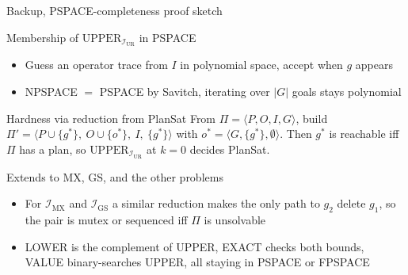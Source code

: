 \begin{frame}[noframenumbering]{Backup, PSPACE-completeness proof sketch}
    \hypertarget{bk:pspace-proof}{}
    \begin{block}{Membership of $\text{UPPER}_{\mathcal{I}_{\text{UR}}}$ in PSPACE}
        \footnotesize
        \begin{itemize}
            \item Guess an operator trace from $I$ in polynomial space, accept when $g$ appears
            \item NPSPACE $=$ PSPACE by Savitch, iterating over $|G|$ goals stays polynomial
        \end{itemize}
    \end{block}

    \begin{block}{Hardness via reduction from PlanSat}
        \footnotesize
        From $\Pi = \langle P, O, I, G \rangle$, build $\Pi' = \langle P \cup \{g^*\},\ O \cup \{o^*\},\ I,\ \{g^*\} \rangle$ with $o^* = \langle G, \{g^*\}, \emptyset \rangle$. Then $g^*$ is reachable iff $\Pi$ has a plan, so $\text{UPPER}_{\mathcal{I}_{\text{UR}}}$ at $k = 0$ decides PlanSat.
    \end{block}

    \begin{block}{Extends to MX, GS, and the other problems}
        \footnotesize
        \begin{itemize}
            \item For $\mathcal{I}_{\text{MX}}$ and $\mathcal{I}_{\text{GS}}$ a similar reduction makes the only path to $g_2$ delete $g_1$, so the pair is mutex or sequenced iff $\Pi$ is unsolvable
            \item LOWER is the complement of UPPER, EXACT checks both bounds, VALUE binary-searches UPPER, all staying in PSPACE or FPSPACE
        \end{itemize}
    \end{block}

\end{frame}

